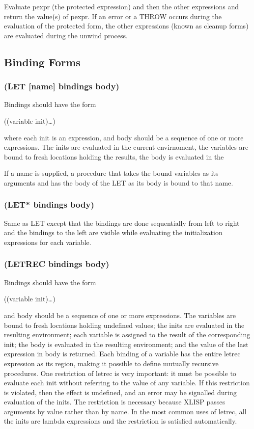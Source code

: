 \documentclass[11pt]{article}
\begin{document}
Evaluate pexpr (the protected expression) and then the other
expressions and return the value(s) of pexpr.  If an error or a THROW
occurs during the evaluation of the protected form, the other
expressions (known as cleanup forms) are evaluated during the unwind
process.
\subsection{Binding Forms}
\label{sec-4-6}

\subsubsection{(LET [name] bindings body)}
\label{sec-4-6-1}

Bindings should have the form

((variable init)\ldots{})

where each init is an expression, and body should be a sequence of
one or more expressions.  The inits are evaluated in the current
envirnoment, the variables are bound to fresh locations holding the
results, the body is evaluated in the

If a name is supplied, a procedure that takes the bound variables as
its arguments and has the body of the LET as its body is bound to
that name.
\subsubsection{(LET* bindings body)}
\label{sec-4-6-2}

Same as LET except that the bindings are done sequentially from left
to right and the bindings to the left are visible while evaluating
the initialization expressions for each variable.
\subsubsection{(LETREC bindings body)}
\label{sec-4-6-3}

Bindings should have the form

((variable init)\ldots{})

and body should be a sequence of one or more expressions.  The
variables are bound to fresh locations holding undefined values; the
inits are evaluated in the resulting environment; each variable is
assigned to the result of the corresponding init; the body is
evaluated in the resulting environment; and the value of the last
expression in body is returned.  Each binding of a variable has the
entire letrec expression as its region, making it possible to define
mutually recursive procedures.  One restriction of letrec is very
important: it must be possible to evaluate each init without
referring to the value of any variable.  If this restriction is
violated, then the effect is undefined, and an error may be signalled
during evaluation of the inits.  The restriction is necessary because
XLISP passes arguments by value rather than by name.  In the most
common uses of letrec, all the inits are lambda expressions and the
restriction is satisfied automatically.
\end{document}

